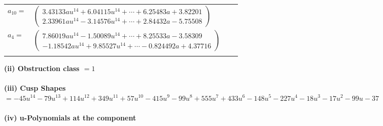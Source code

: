 \documentclass[1p]{elsarticle_modified}
\theoremstyle{definition}
\begin{document}
\begin{tabular}{m{7pt} m{180pt} m{7pt} m{180pt} }
\flushright $a_{10}=$&$\begin{pmatrix}3.43133 a u^{14}+6.04115 u^{14}+\cdots+6.25483 a+3.82201\\2.33961 a u^{14}-3.14576 u^{14}+\cdots+2.84432 a-5.75508\end{pmatrix}$ \\
\flushright $a_{4}=$&$\begin{pmatrix}7.86019 a u^{14}-1.50089 u^{14}+\cdots+8.25533 a-3.58309\\-1.18542 a u^{14}+9.85527 u^{14}+\cdots-0.824492 a+4.37716\end{pmatrix}$\\&\end{tabular}
\flushleft \textbf{(ii) Obstruction class $= 1$}\\~\\
\flushleft \textbf{(iii) Cusp Shapes $= -45 u^{14}-79 u^{13}+114 u^{12}+349 u^{11}+57 u^{10}-415 u^9-99 u^8+555 u^7+433 u^6-148 u^5-227 u^4-18 u^3-17 u^2-99 u-37$}\\~\\
\newpage\renewcommand{\arraystretch}{1}
\flushleft \textbf{(iv) u-Polynomials at the component}\newline \\
\end{document}
